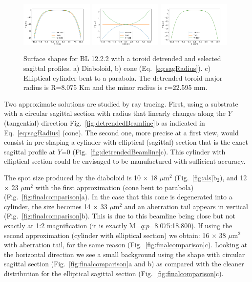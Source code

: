 \documentclass{iucr}              %
\begin{document}
\begin{figure}
\includegraphics[width=0.32\textwidth]{figures/diaboloid_bl1222_detrended_profile.png}
\includegraphics[width=0.32\textwidth]{figures/linearizedparaboliccone_bl1222_detrended_profile.png}
\includegraphics[width=0.32\textwidth]{figures/ellipticalcylinder_bl1222_detrended_profile.png}

\caption{Surface shapes for BL 12.2.2 with a toroid detrended and selected sagittal profiles.
a) Diaboloid, b) cone (Eq.~\ref{eq:sagRadius}). c) Elliptical cylinder bent to a parabola. The detrended toroid major radius is R=8.075 Km and the minor radius is  r=22.595 mm.
}
\end{figure}

Two approximate solutions are studied by ray tracing. First, using a substrate with a circular sagittal section with radius that linearly changes along the $Y$ (tangential) direction Fig.~\ref{fig:detrendedBeamline}b as indicated in Eq.~\ref{eq:sagRadius} (cone). The second one, more precise at a first view, would consist in pre-shaping a cylinder with elliptical (sagittal) section that is the exact sagittal profile at $Y$=0 (Fig.~\ref{fig:detrendedBeamline}c).  This cylinder with elliptical section could be envisaged to be manufactured with sufficient accuracy. 

The spot size produced by the diaboloid is 10 $\times$ 18 $\mu$m$^2$ (Fig.~\ref{fig:als}b$_2$), and 12 $\times$ 23 $\mu$m$^2$ with the first approximation (cone bent to parabola) (Fig.~\ref{fig:finalcomparison}a). In the case that this cone is degenerated into a cylinder, the size becomes 14 $\times$ 33 $\mu$m$^2$ and an aberration tail appears in vertical (Fig.~\ref{fig:finalcomparison}b). This is due to this beamline being close but not exactly at 1:2 magnification (it is exactly M=$q$:$p$=8.075:18.800). If using the second approximation (cylinder with elliptical section) we obtain: 16 $\times$ 38 $\mu$m$^2$ with aberration tail, for the same reason (Fig.~\ref{fig:finalcomparison}c). Looking at the horizontal direction we see a small background using the shape with circular sagittal section (Fig.~\ref{fig:finalcomparison}a and b) as compared with the cleaner distribution for the elliptical sagittal section (Fig.~\ref{fig:finalcomparison}c). 
\end{document}
